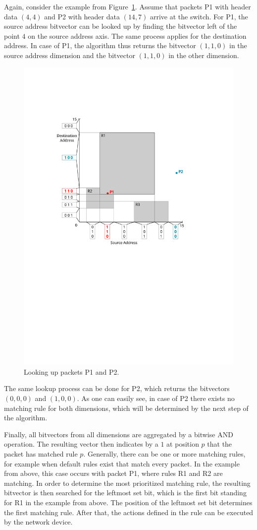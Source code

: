 \documentclass[conference]{IEEEtran}
\begin{document}
Again, consider the example from Figure~\ref{fig:bv-lookup}.
Assume that packets P1 with header data $(4, 4)$ and P2 with header data $(14, 7)$ arrive at the switch.
For P1, the source address bitvector can be looked up by finding the
bitvector left of the point $4$ on the source address axis.
The same process applies for the destination address.
In case of P1, the algorithm thus returns the bitvector $(1, 1, 0)$ in the 
source address dimension and the bitvector $(1, 1, 0)$ in the other dimension.

\begin{figure}
\centering
\includegraphics[width=0.8\linewidth]{images/bitvector-L1_3}
\caption{Looking up packets P1 and P2.}
\label{fig:bv-lookup}
\end{figure}

The same lookup process can be done for P2, which returns the bitvectors $(0, 0, 0)$ and $(1, 0, 0)$.
As one can easily see, in case of P2 there exists no matching rule for both dimensions,
which will be determined by the next step of the algorithm.

Finally, all bitvectors from all dimensions are aggregated by a bitwise AND operation.
The resulting vector then indicates by a $1$ at position $p$ that the packet has matched rule $p$.
Generally, there can be one or more matching rules, for example when default rules exist that match every packet.
In the example from above, this case occurs with packet P1, where rules R1 and R2 are matching.
In order to determine the most prioritized matching rule, the resulting 
bitvector is then searched for the leftmost set bit, which is the first bit standing for R1 in the example from above.
The position of the leftmost set bit determines the first matching rule.
After that, the actions defined in the rule can be executed by the network device.
\end{document}
